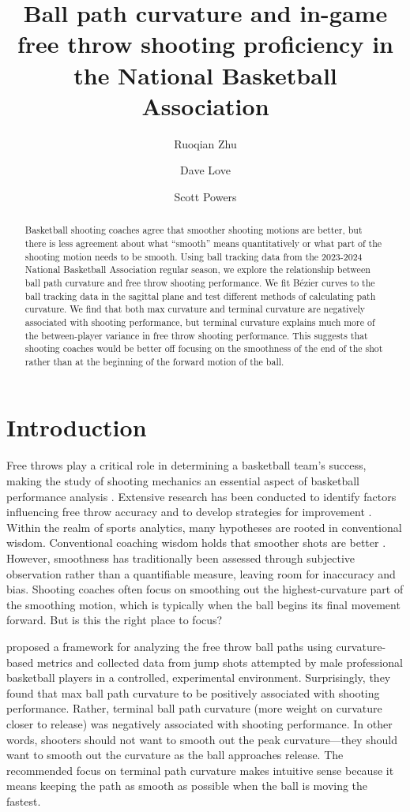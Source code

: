 \documentclass{article}
\title{Ball path curvature and in-game free throw shooting proficiency in the National Basketball Association}
\author[1]{Ruoqian Zhu}
\author[2]{Dave Love}
\author[3]{Scott Powers}
\affil[1]{Department of Mathematics, Rice University}
\affil[2]{CDL Basketball Enterprises}
\affil[3]{Department of Sport Management, Rice University}
\begin{document}
  \maketitle

  \begin{abstract}
    Basketball shooting coaches agree that smoother shooting motions are better, but there is less agreement about what ``smooth'' means quantitatively or what part of the shooting motion needs to be smooth. Using ball tracking data from the 2023-2024 National Basketball Association regular season, we explore the relationship between ball path curvature and free throw shooting performance. We fit Bézier curves to the ball tracking data in the sagittal plane and test different methods of calculating path curvature. We find that both max curvature and terminal curvature are negatively associated with shooting performance, but terminal curvature explains much more of the between-player variance in free throw shooting performance. This suggests that shooting coaches would be better off focusing on the smoothness of the end of the shot rather than at the beginning of the forward motion of the ball.
  \end{abstract}

  \section{Introduction}

    Free throws play a critical role in determining a basketball team's success, making the study of shooting mechanics an essential aspect of basketball performance analysis \citep{kozar_importance_1994}. Extensive research has been conducted to identify factors influencing free throw accuracy and to develop strategies for improvement \citep{tran_optimal_2008}. Within the realm of sports analytics, many hypotheses are rooted in conventional wisdom. Conventional coaching wisdom holds that smoother shots are better \citep{haefner_7_2010, penny_overlooked_2016}. However, smoothness has traditionally been assessed through subjective observation rather than a quantifiable measure, leaving room for inaccuracy and bias. Shooting coaches often focus on smoothing out the highest-curvature part of the smoothing motion, which is typically when the ball begins its final movement forward. But is this the right place to focus?
    
    \citet{slegers_role_2024} proposed a framework for analyzing the free throw ball paths using curvature-based metrics and collected data from jump shots attempted by male professional basketball players in a controlled, experimental environment. Surprisingly, they found that max ball path curvature to be positively associated with shooting performance. Rather, terminal ball path curvature (more weight on curvature closer to release) was negatively associated with shooting performance. In other words, shooters should not want to smooth out the peak curvature---they should want to smooth out the curvature as the ball approaches release. The recommended focus on terminal path curvature makes intuitive sense because it means keeping the path as smooth as possible when the ball is moving the fastest.
\end{document}
